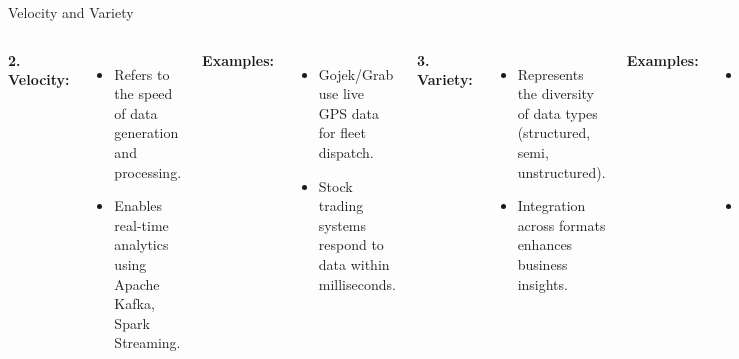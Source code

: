 \documentclass[aspectratio=169, table]{beamer}
\begin{document}
	\begin{frame}[fragile]{Velocity and Variety}
		\vspace{20pt}
		\begin{columns}[T]
			\textbf{2. Velocity:}
			\begin{itemize}
				\item Refers to the speed of data generation and processing.
				\item Enables real-time analytics using Apache Kafka, Spark Streaming.
			\end{itemize}
			
			\vspace{10pt}
			\textbf{Examples:}
			\begin{itemize}
				\item Gojek/Grab use live GPS data for fleet dispatch.
				\item Stock trading systems respond to data within milliseconds.
			\end{itemize}
			
			\textbf{3. Variety:}
			\begin{itemize}
				\item Represents the diversity of data types (structured, semi, unstructured).
				\item Integration across formats enhances business insights.
			\end{itemize}
			
			\vspace{10pt}
			\textbf{Examples:}
			\begin{itemize}
				\item TikTok processes videos, audio, and user metadata.
				\item Telkom combines billing and call centre transcripts.
			\end{itemize}
		\end{columns}
	\end{frame}
	
\end{document}
